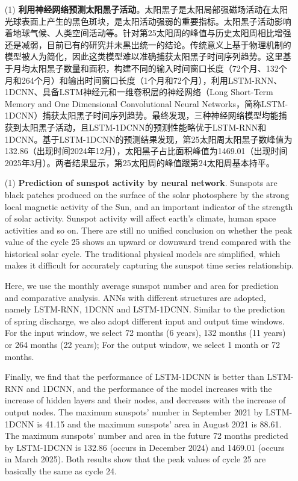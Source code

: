 \begin{enumerate}

  \item[(1)] \textbf{利用神经网络预测太阳黑子活动}。太阳黑子是太阳局部强磁场活动在太阳光球表面上产生的黑色斑块，是太阳活动强弱的重要指标。太阳黑子活动影响着地球气候、人类空间活动等。针对第25太阳周的峰值与历史太阳周相比增强还是减弱，目前已有的研究并未黑出统一的结论。传统意义上基于物理机制的模型被人为简化，因此这类模型难以准确捕获太阳黑子时间序列趋势。这里基于月均太阳黑子数量和面积，构建不同的输入时间窗口长度（72个月、132个月和264个月）和输出时间窗口长度（1个月和72个月），利用LSTM-RNN、1DCNN、具备LSTM神经元和一维卷积层的神经网络（Long Short-Term Memory and One Dimensional Convolutional Neural Networks，简称LSTM-1DCNN）捕获太阳黑子时间序列趋势。最终发现，三种神经网络模型均能捕获到太阳黑子活动，且LSTM-1DCNN的预测性能略优于LSTM-RNN和1DCNN。基于LSTM-1DCNN的预测结果发现，第25太阳周太阳黑子数峰值为132.86（出现时间2024年12月），太阳黑子占比面积峰值为1469.01（出现时间2025年3月）。两者结果显示，第25太阳周的峰值跟第24太阳周基本持平。

  \item[(1)] \textbf{Prediction of sunspot activity by neural network}. Sunspots are black patches produced on the surface of the solar photosphere by the strong local magnetic activity of the Sun, and an important indicator of the strength of solar activity. Sunspot activity will affect earth's climate, human space activities and so on. There are still no unified conclusion on whether the peak value of the cycle 25 shows an upward or downward trend compared with the historical solar cycle. The traditional physical models are simplified, which makes it difficult for accurately capturing the sunspot time series relationship.

  Here, we use the monthly average sunspot number and area for prediction and comparative analysis. ANNs with different structures are adopted, namely LSTM-RNN, 1DCNN and LSTM-1DCNN. Similar to the prediction of spring discharge, we also adopt different input and output time windows. For the input window, we select 72 months (6 years), 132 months (11 years) or 264 months (22 years);  For the output window, we select 1 month or 72 months.

  Finally, we find that the performance of LSTM-1DCNN is better than LSTM-RNN and 1DCNN, and the performance of the model increases with the increase of hidden layers and their nodes, and decreases with the increase of output nodes. The maximum sunspots' number in September 2021 by LSTM-1DCNN is 41.15 and the maximum sunspots' area in August 2021 is 88.61. The maximum sunspots' number and area in the future 72 months predicted by LSTM-1DCNN is 132.86 (occurs in December 2024) and 1469.01 (occurs in March 2025). Both results show that the peak values of cycle 25 are basically the same as cycle 24. 


\end{enumerate}
